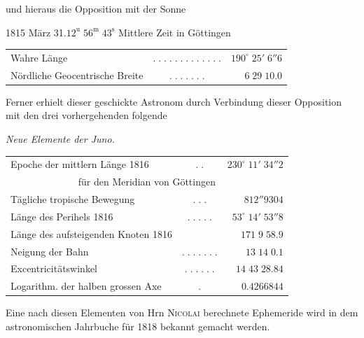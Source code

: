 \noindent und hieraus die Opposition mit der Sonne

\begin{center}1815 März 31.\quad $12^{\mathrm u}\;56^{\mathrm m}\;43^{\mathrm s}$ Mittlere Zeit in Göttingen\end{center}
\begin{center}\fontsize{9}{11}\selectfont\setlength{\tabcolsep}{2pt}\renewcommand{\arraystretch}{1.15}\begin{tabular}{lcr}
Wahre Länge & $.\;.\;.\;.\;.\;.\;.\;.\;.\;.\;.\;.\;.$ & $190^\circ\;25'\;6''6$\\
Nördliche Geocentrische Breite & $.\;.\;.\;.\;.\;.\;.$ & $6\;29\;10.0$\\
\end{tabular}\end{center}

\par\indent Ferner erhielt dieser geschickte Astronom durch Verbindung dieser Opposition mit den drei vorhergehenden folgende

\begin{center}
\emph{Neue Elemente der Juno.}
\end{center}

\begin{center}\fontsize{9}{11}\selectfont\setlength{\tabcolsep}{2pt}\renewcommand{\arraystretch}{1.15}\begin{tabular}{lcr}
Epoche der mittlern Länge 1816 & $.\;.$ & $230^\circ\;11'\;34''2$\\
\multicolumn{3}{c}{für den Meridian von Göttingen}\\
Tägliche tropische Bewegung & $.\;.\;.$ & $812''9304$\\
Länge des Perihels 1816 & $.\;.\;.\;.\;.$ & $53^\circ\;14'\;53''8$\\
Länge des aufsteigenden Knoten 1816 &  & $171\;9\;58.9$\\
Neigung der Bahn & $.\;.\;.\;.\;.\;.\;.$ & $13\;14\;0.1$\\
Excentricitätswinkel & $.\;.\;.\;.\;.\;.$ & $14\;43\;28.84$\\
Logarithm. der halben grossen Axe & $.$ & $0.4266844$\\
\end{tabular}\end{center}

\par\indent Eine nach diesen Elementen von Hrn \textsc{Nicolai} berechnete Ephemeride wird in dem astronomischen Jahrbuche für 1818 bekannt gemacht werden.
